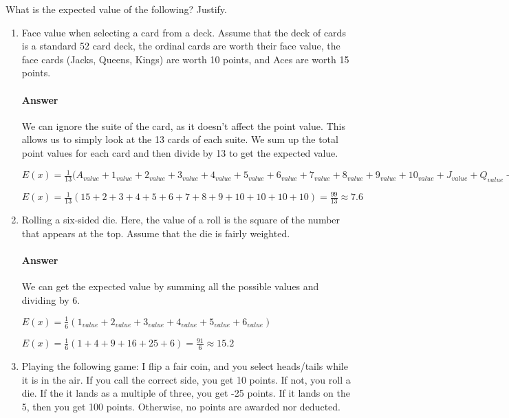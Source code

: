 \documentclass{article}
\begin{document}
What is the expected value of the following? Justify.

\begin{enumerate}
    \item Face value when selecting a card from a deck.  Assume that the deck of
        cards is a standard 52 card deck, the ordinal cards are worth their face
        value, the face cards (Jacks, Queens, Kings) are
        worth 10 points, and Aces are worth 15 points.
        
        \paragraph{Answer} We can ignore the suite of the card, as it doesn't affect the point value. This allows us to simply look at the 13 cards of each suite. We sum up the total point values for each card and then divide by 13 to get the expected value.
        
        $E(x) = \frac{1}{13}(A_{value} + 1_{value} + 2_{value} + 3_{value} + 4_{value} + 5_{value} + 6_{value} + 7_{value} + 8_{value} + 9_{value} + 10_{value} + J_{value} + Q_{value} + K_{value}$
        
        $E(x) = \frac{1}{13}(15 + 2 + 3 + 4 + 5 + 6 + 7 + 8 + 9 + 10 + 10 + 10 + 10) = \frac{99}{13} \approx 7.6$
        
    \item Rolling a six-sided die.  Here, the value of a roll is the square of
        the number that appears at the top.  Assume that the die is fairly
        weighted.
        
        \paragraph{Answer} We can get the expected value by summing all the possible values and dividing by 6.
        
        $E(x) = \frac{1}{6}(1_{value} + 2_{value} + 3_{value} + 4_{value} + 5_{value} + 6_{value})$
        
        $E(x) = \frac{1}{6}(1 + 4 + 9 + 16 + 25 + 6) = \frac{91}{6} \approx 15.2$
        
    \item Playing the following game: I flip a fair coin, and you select
        heads/tails while it is in the air.  If you call the correct side,
        you get 10 points.  If not, you roll a die.  If the it lands as a
        multiple of three, you get -25 points.
        If it lands on the 5, then you get 100 points.  Otherwise, no points are
        awarded nor deducted.
        

\end{enumerate}
\end{document}
